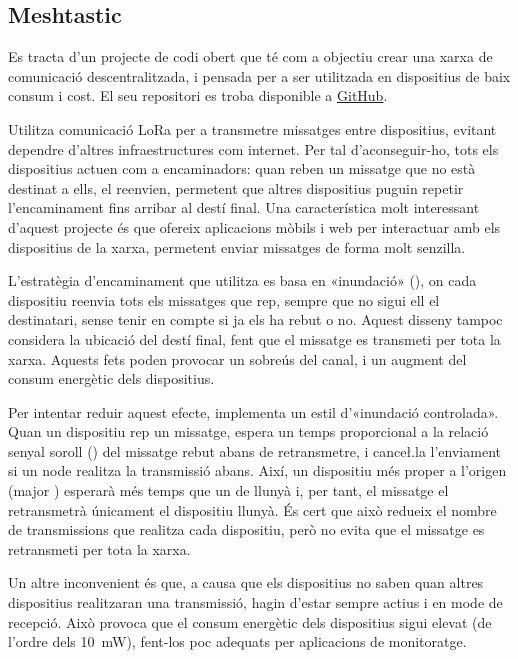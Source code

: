 \documentclass{tfgitic}[2024/07/01]
\begin{document}
\subsection{Meshtastic}
Es tracta d'un projecte de codi obert que té com a objectiu crear una xarxa de comunicació descentralitzada, i pensada per a ser utilitzada en dispositius de baix consum i cost. El seu repositori es troba disponible a \href{https://github.com/meshtastic}{GitHub}.

Utilitza comunicació LoRa per a transmetre missatges entre dispositius, evitant dependre d'altres infraestructures com internet. Per tal d'aconseguir-ho, tots els dispositius actuen com a encaminadors: quan reben un missatge que no està destinat a ells, el reenvien, permetent que altres dispositius puguin repetir l'encaminament fins arribar al destí final. Una característica molt interessant d'aquest projecte és que ofereix aplicacions mòbils i web per interactuar amb els dispositius de la xarxa, permetent enviar missatges de forma molt senzilla.

L'estratègia d'encaminament que utilitza es basa en «inundació» (), on cada dispositiu reenvia tots els missatges que rep, sempre que no sigui ell el destinatari, sense tenir en compte si ja els ha rebut o no. Aquest disseny tampoc considera la ubicació del destí final, fent que el missatge es transmeti per tota la xarxa. Aquests fets poden provocar un sobreús del canal, i un augment del consum energètic dels dispositius. 

Per intentar reduir aquest efecte, implementa un estil d'«inundació controlada». Quan un dispositiu rep un missatge, espera un temps proporcional a la relació senyal soroll () del missatge rebut abans de retransmetre, i cance\l.la l'enviament si un node realitza la transmissió abans. Així, un dispositiu més proper a l'origen (major ) esperarà més temps que un de llunyà i, per tant, el missatge el retransmetrà únicament el dispositiu llunyà. És cert que això redueix el nombre de transmissions que realitza cada dispositiu, però no evita que el missatge es retransmeti per tota la xarxa. 

Un altre inconvenient és que, a causa que els dispositius no saben quan altres dispositius realitzaran una transmissió, hagin d'estar sempre actius i en mode de recepció. Això provoca que el consum energètic dels dispositius sigui elevat (de l'ordre dels \SI{10}{\milli\watt}), fent-los poc adequats per aplicacions de monitoratge.
\end{document}
